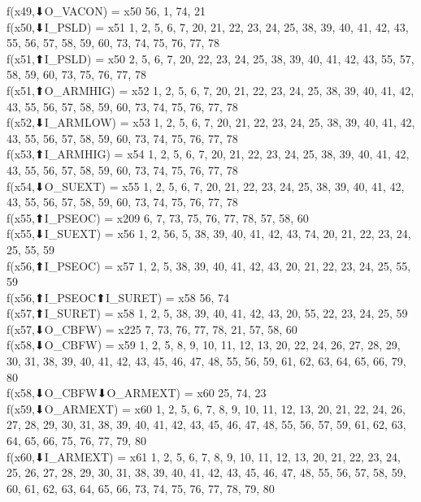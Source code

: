 f(x49,⬇O_VACON) = x50 {56, 1, 74, 21} \\
f(x50,⬇I_PSLD) = x51 {1, 2, 5, 6, 7, 20, 21, 22, 23, 24, 25, 38, 39, 40, 41, 42, 43, 55, 56, 57, 58, 59, 60, 73, 74, 75, 76, 77, 78} \\
f(x51,⬆I_PSLD) = x50 {2, 5, 6, 7, 20, 22, 23, 24, 25, 38, 39, 40, 41, 42, 43, 55, 57, 58, 59, 60, 73, 75, 76, 77, 78} \\
f(x51,⬆O_ARMHIG) = x52 {1, 2, 5, 6, 7, 20, 21, 22, 23, 24, 25, 38, 39, 40, 41, 42, 43, 55, 56, 57, 58, 59, 60, 73, 74, 75, 76, 77, 78} \\
f(x52,⬇I_ARMLOW) = x53 {1, 2, 5, 6, 7, 20, 21, 22, 23, 24, 25, 38, 39, 40, 41, 42, 43, 55, 56, 57, 58, 59, 60, 73, 74, 75, 76, 77, 78} \\
f(x53,⬆I_ARMHIG) = x54 {1, 2, 5, 6, 7, 20, 21, 22, 23, 24, 25, 38, 39, 40, 41, 42, 43, 55, 56, 57, 58, 59, 60, 73, 74, 75, 76, 77, 78} \\
f(x54,⬇O_SUEXT) = x55 {1, 2, 5, 6, 7, 20, 21, 22, 23, 24, 25, 38, 39, 40, 41, 42, 43, 55, 56, 57, 58, 59, 60, 73, 74, 75, 76, 77, 78} \\
f(x55,⬆I_PSEOC) = x209 {6, 7, 73, 75, 76, 77, 78, 57, 58, 60} \\
f(x55,⬇I_SUEXT) = x56 {1, 2, 56, 5, 38, 39, 40, 41, 42, 43, 74, 20, 21, 22, 23, 24, 25, 55, 59} \\
f(x56,⬆I_PSEOC) = x57 {1, 2, 5, 38, 39, 40, 41, 42, 43, 20, 21, 22, 23, 24, 25, 55, 59} \\
f(x56,⬆I_PSEOC⬆I_SURET) = x58 {56, 74} \\
f(x57,⬆I_SURET) = x58 {1, 2, 5, 38, 39, 40, 41, 42, 43, 20, 55, 22, 23, 24, 25, 59} \\
f(x57,⬇O_CBFW) = x225 {7, 73, 76, 77, 78, 21, 57, 58, 60} \\
f(x58,⬇O_CBFW) = x59 {1, 2, 5, 8, 9, 10, 11, 12, 13, 20, 22, 24, 26, 27, 28, 29, 30, 31, 38, 39, 40, 41, 42, 43, 45, 46, 47, 48, 55, 56, 59, 61, 62, 63, 64, 65, 66, 79, 80} \\
f(x58,⬇O_CBFW⬇O_ARMEXT) = x60 {25, 74, 23} \\
f(x59,⬇O_ARMEXT) = x60 {1, 2, 5, 6, 7, 8, 9, 10, 11, 12, 13, 20, 21, 22, 24, 26, 27, 28, 29, 30, 31, 38, 39, 40, 41, 42, 43, 45, 46, 47, 48, 55, 56, 57, 59, 61, 62, 63, 64, 65, 66, 75, 76, 77, 79, 80} \\
f(x60,⬇I_ARMEXT) = x61 {1, 2, 5, 6, 7, 8, 9, 10, 11, 12, 13, 20, 21, 22, 23, 24, 25, 26, 27, 28, 29, 30, 31, 38, 39, 40, 41, 42, 43, 45, 46, 47, 48, 55, 56, 57, 58, 59, 60, 61, 62, 63, 64, 65, 66, 73, 74, 75, 76, 77, 78, 79, 80} \\
